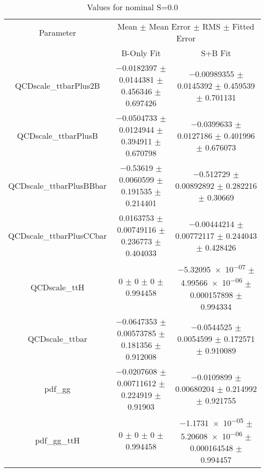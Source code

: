 \begin{table}
\centering
\caption{Values for nominal S=0.0}
\begin{tabular}{ccc}
\toprule
Parameter & \multicolumn{2}{c}{Mean $\pm$ Mean Error $\pm$ RMS $\pm$ Fitted Error}\\
 & B-Only Fit & S+B Fit\\
\midrule
QCDscale\_ttbarPlus2B & \num{-0.0182397} $\pm$ \num{0.0144381} $\pm$ \num{0.456346} $\pm$ \num{0.697426} & \num{-0.00989355} $\pm$ \num{0.0145392} $\pm$ \num{0.459539} $\pm$ \num{0.701131}\\
QCDscale\_ttbarPlusB & \num{-0.0504733} $\pm$ \num{0.0124944} $\pm$ \num{0.394911} $\pm$ \num{0.670798} & \num{-0.0399633} $\pm$ \num{0.0127186} $\pm$ \num{0.401996} $\pm$ \num{0.676073}\\
QCDscale\_ttbarPlusBBbar & \num{-0.53619} $\pm$ \num{0.0060599} $\pm$ \num{0.191535} $\pm$ \num{0.214401} & \num{-0.512729} $\pm$ \num{0.00892892} $\pm$ \num{0.282216} $\pm$ \num{0.30669}\\
QCDscale\_ttbarPlusCCbar & \num{0.0163753} $\pm$ \num{0.00749116} $\pm$ \num{0.236773} $\pm$ \num{0.404033} & \num{-0.00444214} $\pm$ \num{0.00772117} $\pm$ \num{0.244043} $\pm$ \num{0.428426}\\
QCDscale\_ttH & \num{0} $\pm$ \num{0} $\pm$ \num{0} $\pm$ \num{0.994458} & \num{-5.32095e-07} $\pm$ \num{4.99566e-06} $\pm$ \num{0.000157898} $\pm$ \num{0.994334}\\
QCDscale\_ttbar & \num{-0.0647353} $\pm$ \num{0.00573785} $\pm$ \num{0.181356} $\pm$ \num{0.912008} & \num{-0.0544525} $\pm$ \num{0.0054599} $\pm$ \num{0.172571} $\pm$ \num{0.910089}\\
pdf\_gg & \num{-0.0207608} $\pm$ \num{0.00711612} $\pm$ \num{0.224919} $\pm$ \num{0.91903} & \num{-0.0109899} $\pm$ \num{0.00680204} $\pm$ \num{0.214992} $\pm$ \num{0.921755}\\
pdf\_gg\_ttH & \num{0} $\pm$ \num{0} $\pm$ \num{0} $\pm$ \num{0.994458} & \num{-1.1731e-05} $\pm$ \num{5.20608e-06} $\pm$ \num{0.000164548} $\pm$ \num{0.994457}\\
\bottomrule
\end{tabular}
\end{table}